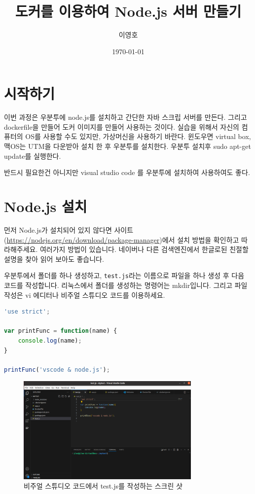 \documentclass{article}
\title{도커를 이용하여 Node.js 서버 만들기}
\author{이영호}
\affil{국립목포대학교 컴퓨터공학과\\ \texttt{youngho.lee@gmail.com}}
\date{\today}
\begin{document}
\maketitle
\tableofcontents

\clearpage

\section{시작하기}
이번 과정은 우분투에 node.js를 설치하고 간단한 자바 스크립 서버를 만든다. 그리고 dockerfile을 만들어 도커 이미지를 만들어 사용하는 것이다. 실습을 위해서 자신의 컴퓨터의 OS를 사용할 수도 있지만, 가상머신을 사용하기 바란다. 윈도우면 virtual box, 맥OS는 UTM을 다운받아 설치 한 후 우분투를 설치한다. 우분투 설치후 sudo apt-get update를 실행한다. 

반드시 필요한건 아니지만 visual studio code 를 우분투에 설치하여 사용하여도 좋다. 

\section{Node.js 설치}
먼저 Node.js가 설치되어 있지 않다면 사이트(\url{https://nodejs.org/en/download/package-manager})에서 설치 방법을 확인하고 따라해주세요. 여러가지 방법이 있습니다. 네이버나 다른 검색엔진에서 한글로된 친절할 설명을 찾아 읽어 보아도 좋습니다. 

우분투에서 폴더를 하나 생성하고, \texttt{test.js}라는 이름으로 파일을 하나 생성 후 다음 코드를 작성합니다. 리눅스에서 폴더를 생성하는 명령어는 mkdir입니다. 그리고 파일 작성은 vi 에디터나 비주얼 스튜디오 코드를 이용하세요. 

\begin{lstlisting}[language=JavaScript, caption={test.js 예제}]
'use strict';

var printFunc = function(name) {
    console.log(name);
}

printFunc('vscode & node.js');
\end{lstlisting}

\begin{figure}[htb]
  \centering
  \includegraphics[width=0.8\textwidth]{images/test.js.png}
  \caption{비주얼 스튜디오 코드에서 test.js를 작성하는 스크린 샷}
  \label{fig:testjs}
\end{figure}
\end{document}
